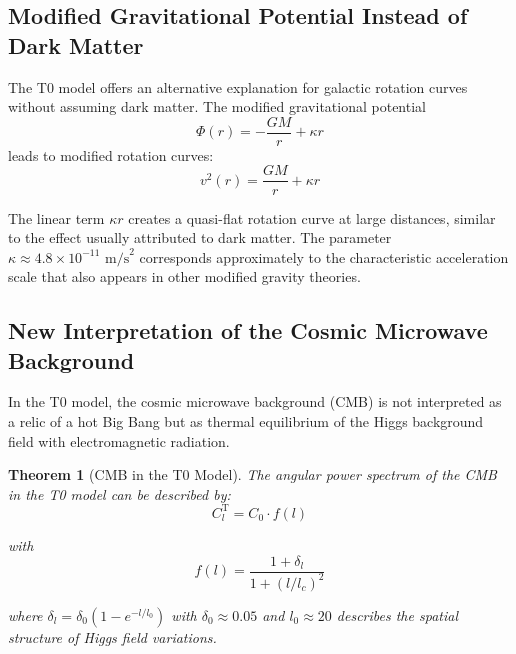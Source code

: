 \documentclass{article}
\newtheorem{theorem}{Theorem}[section]
\theoremstyle{definition}
\theoremstyle{remark}
\begin{document}
	\subsection{Modified Gravitational Potential Instead of Dark Matter}
	
	The T0 model offers an alternative explanation for galactic rotation curves without assuming dark matter. The modified gravitational potential
	\begin{equation}
		\Phi(r) = -\frac{GM}{r} + \kappa r
	\end{equation}
	leads to modified rotation curves:
	\begin{equation}
		v^2(r) = \frac{GM}{r} + \kappa r
	\end{equation}
	
	The linear term $\kappa r$ creates a quasi-flat rotation curve at large distances, similar to the effect usually attributed to dark matter. The parameter $\kappa \approx 4.8 \times 10^{-11} \text{ m/s}^2$ corresponds approximately to the characteristic acceleration scale that also appears in other modified gravity theories.
	
	\subsection{New Interpretation of the Cosmic Microwave Background}
	
	In the T0 model, the cosmic microwave background (CMB) is not interpreted as a relic of a hot Big Bang but as thermal equilibrium of the Higgs background field with electromagnetic radiation.
	
	\begin{theorem}[CMB in the T0 Model]
		The angular power spectrum of the CMB in the T0 model can be described by:
		\begin{equation}
			C_l^{\text{T}} = C_0 \cdot f(l)
		\end{equation}
		
		with
		\begin{equation}
			f(l) = \frac{1 + \delta_l}{1 + (l/l_c)^2}
		\end{equation}
		
		where $\delta_l = \delta_0 (1 - e^{-l/l_0})$ with $\delta_0 \approx 0.05$ and $l_0 \approx 20$ describes the spatial structure of Higgs field variations.
	\end{theorem}
	
\end{document}
